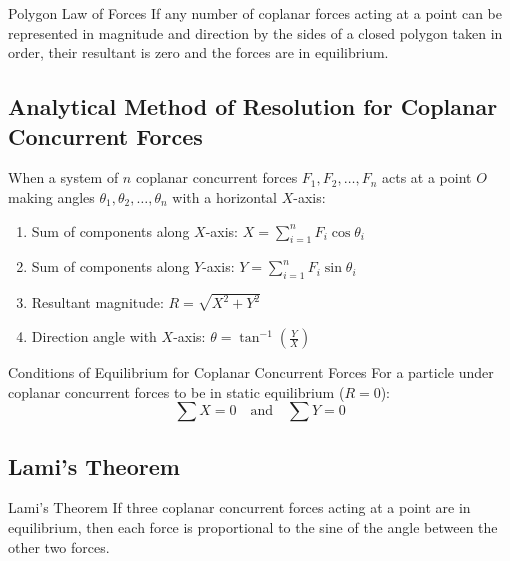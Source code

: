 \documentclass[11pt,a4paper]{article}
\begin{document}
\begin{theorembox}{Polygon Law of Forces}
If any number of coplanar forces acting at a point can be represented in magnitude and direction by the sides of a closed polygon taken in order, their resultant is zero and the forces are in equilibrium.
\end{theorembox}

\subsection{Analytical Method of Resolution for Coplanar Concurrent Forces}
When a system of $n$ coplanar concurrent forces $F_1, F_2, \dots, F_n$ acts at a point $O$ making angles $\theta_1, \theta_2, \dots, \theta_n$ with a horizontal $X$-axis:
\begin{enumerate}
    \item Sum of components along $X$-axis: $X = \sum_{i=1}^n F_i \cos\theta_i$
    \item Sum of components along $Y$-axis: $Y = \sum_{i=1}^n F_i \sin\theta_i$
    \item Resultant magnitude: $R = \sqrt{X^2 + Y^2}$
    \item Direction angle with $X$-axis: $\theta = \tan^{-1}\left(\frac{Y}{X}\right)$
\end{enumerate}

\begin{importantbox}{Conditions of Equilibrium for Coplanar Concurrent Forces}
For a particle under coplanar concurrent forces to be in static equilibrium ($R = 0$):
\begin{equation}
\sum X = 0 \quad \text{and} \quad \sum Y = 0
\end{equation}
\end{importantbox}

\subsection{Lami's Theorem}

\begin{theorembox}{Lami's Theorem}
If three coplanar concurrent forces acting at a point are in equilibrium, then each force is proportional to the sine of the angle between the other two forces.
\end{theorembox}
\end{document}
